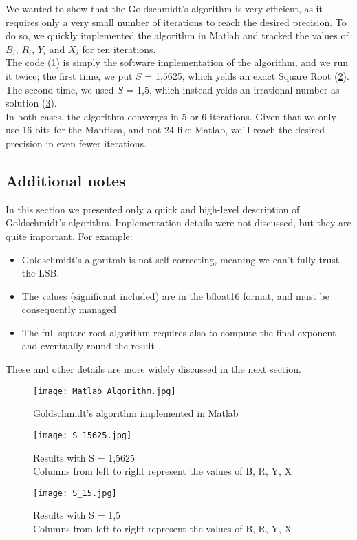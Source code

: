 We wanted to show that the Goldschmidt's algorithm is very efficient, as it requires only a very small number of iterations to reach the desired precision. To do so, we quickly implemented the algorithm in Matlab and tracked the values of $B_i$, $R_i$, $Y_i$ and $X_i$ for ten iterations.\\ The code (\ref{fig:Matlab_Algorithm}) is simply the software implementation of the algorithm, and we run it twice; the first time, we put $S$ = 1,5625, which yelds an exact Square Root (\ref{fig:S_15625}).  The second time, we used $S$ = 1,5, which instead yelds an irrational number as solution (\ref{fig:S_15}).\\
In both cases, the algorithm converges in 5 or 6 iterations. Given that we only use 16 bits for the Mantissa, and not 24 like Matlab, we'll reach the desired precision in even fewer iterations.

\subsection{Additional notes}
In this section we presented only a quick and high-level description of Goldschmidt's algorithm. Implementation details were not discussed, but they are quite important. For example:
\begin{itemize}
\item Goldschmidt's algoritmh is not self-correcting, meaning we can't fully trust the LSB.
\item The values (significant included) are in the bfloat16 format, and must be consequently managed
\item The full square root algorithm requires also to compute the final exponent and eventually round the result
\end{itemize}
These and other details are more widely discussed in the next section.
\begin{figure}[h]
	\centering
	\captionsetup{justification=centering}
	\texttt{[image: Matlab\_Algorithm.jpg]}	
	\caption{Goldschmidt's algorithm implemented in Matlab}
	\label {fig:Matlab_Algorithm}
\end{figure}

\begin{figure}[h]
	\centering
	\captionsetup{justification=centering}
	\texttt{[image: S\_15625.jpg]}	
	\caption{Results with S = 1,5625\\Columns from left to right represent the values of B, R, Y, X}
	\label {fig:S_15625}
\end{figure}


\begin{figure}[h]
	\centering
	\captionsetup{justification=centering}
	\texttt{[image: S\_15.jpg]}	
	\caption{Results with S = 1,5\\Columns from left to right represent the values of B, R, Y, X}
	\label {fig:S_15}
\end{figure}

\clearpage
